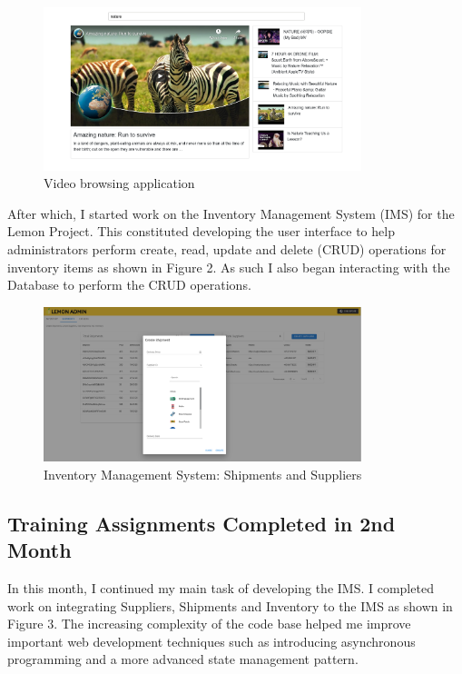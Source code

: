 \begin{figure}[h!]
	\begin{center}
		\includegraphics[width=350px]{assets/images/udemy-project.png}
		\caption{Video browsing application}
		\label{fig:govsg-chatbot}
	\end{center}
\end{figure}

\pagebreak

\noindent
After which, I started work on the Inventory Management System (IMS) for the Lemon Project. This constituted
developing the user interface to help administrators perform create, read, update and delete (CRUD) operations
for inventory items as shown in Figure 2. As such I also began interacting with the Database to perform the CRUD operations.

\begin{figure}[h!]
	\begin{center}
		\includegraphics[width=350px]{assets/images/lemon-shipment.png}
		\caption{Inventory Management System: Shipments and Suppliers}
		\label{fig:lemon-shipment}
	\end{center}
\end{figure}

\subsection{Training Assignments Completed in 2nd Month}
\noindent
In this month, I continued my main task of developing the IMS. I completed work on integrating Suppliers, Shipments and Inventory to the IMS as shown in Figure 3.
The increasing complexity of the code base helped me improve important web development techniques such as introducing asynchronous programming and a more advanced state management pattern.\cite{REF2:1} 

